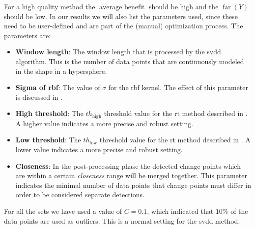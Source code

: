 For a high quality method the $\operatorname*{average\_benefit}$ should be high and the $\operatorname*{far}(Y)$ should be low.
In our results we will also list the parameters used, since these need to be user-defined and are part of the (manual) optimization process.
The parameters are:
\begin{itemize}
  \item \textbf{Window length}: The window length that is processed by the \gls{svdd} algorithm. This is the number of data points that are continuously modeled in the shape in a hypersphere.
  \item \textbf{Sigma of \gls{rbf}}: The value of $\sigma$ for the \gls{rbf} kernel. The effect of this parameter is discussed in .
  \item \textbf{High threshold}: The $th_\text{high}$ threshold value for the \gls{rt} method described in . A higher value indicates a more precise and robust setting.
  \item \textbf{Low threshold}: The $th_\text{low}$ threshold value for the \gls{rt} method described in . A lower value indicates a more precise and robust setting.
  \item \textbf{Closeness}: In the post-processing phase the detected change points which are within a certain \emph{closeness} range will be merged together. This parameter indicates the minimal number of data points that change points must differ in order to be considered separate detections.
\end{itemize}
For all the sets we have used a value of $C = 0.1$, which indicated that $10\%$ of the data points are used as outliers.
This is a normal setting for the \gls{svdd} method.